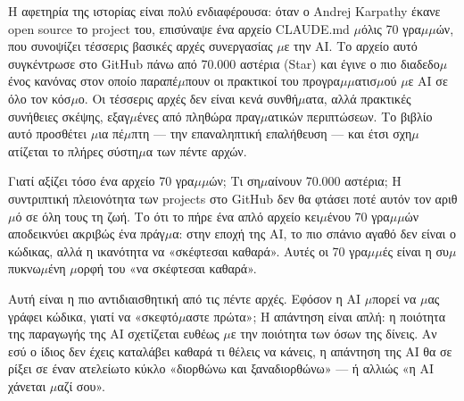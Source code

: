 

Η αφετηρία της ιστορίας είναι πολύ ενδιαφέρουσα: όταν ο Andrej Karpathy έκανε open source το project του, επισύναψε ένα αρχείο CLAUDE.md $\mu$όλις 70 γρα$\mu$$\mu$ών, που συνοψίζει τέσσερις βασικές αρχές συνεργασίας $\mu$ε την AI. Το αρχείο αυτό συγκέντρωσε στο GitHub πάνω από 70.000 αστέρια (Star) και έγινε ο πιο διαδεδο$\mu$ένος κανόνας στον οποίο παραπέ$\mu$πουν οι πρακτικοί του προγρα$\mu$$\mu$ατισ$\mu$ού $\mu$ε AI σε όλο τον κόσ$\mu$ο. Οι τέσσερις αρχές δεν είναι κενά συνθή$\mu$ατα, αλλά πρακτικές συνήθειες σκέψης, εξαγ$\mu$ένες από πληθώρα πραγ$\mu$ατικών περιπτώσεων. Το βιβλίο αυτό προσθέτει $\mu$ια πέ$\mu$πτη — την επαναληπτική επαλήθευση — και έτσι σχη$\mu$ατίζεται το πλήρες σύστη$\mu$α των πέντε αρχών.

\begin{tcbinfo}{Γιατί αξίζει τόσο ένα αρχείο 70 γρα$\mu$$\mu$ών;}
Τι ση$\mu$αίνουν 70.000 αστέρια; Η συντριπτική πλειονότητα των projects στο GitHub δεν θα φτάσει ποτέ αυτόν τον αριθ$\mu$ό σε όλη τους τη ζωή. Το ότι το πήρε ένα απλό αρχείο κει$\mu$ένου 70 γρα$\mu$$\mu$ών αποδεικνύει ακριβώς ένα πράγ$\mu$α: στην εποχή της AI, το πιο σπάνιο αγαθό δεν είναι ο κώδικας, αλλά η ικανότητα να «σκέφτεσαι καθαρά». Αυτές οι 70 γρα$\mu$$\mu$ές είναι η συ$\mu$πυκνω$\mu$ένη $\mu$ορφή του «να σκέφτεσαι καθαρά».

\end{tcbinfo}


Αυτή είναι η πιο αντιδιαισθητική από τις πέντε αρχές. Εφόσον η AI $\mu$πορεί να $\mu$ας γράφει κώδικα, γιατί να «σκεφτό$\mu$αστε πρώτα»; Η απάντηση είναι απλή: η ποιότητα της παραγωγής της AI σχετίζεται ευθέως $\mu$ε την ποιότητα των όσων της δίνεις. Αν εσύ ο ίδιος δεν έχεις καταλάβει καθαρά τι θέλεις να κάνεις, η απάντηση της AI θα σε ρίξει σε έναν ατελείωτο κύκλο «διορθώνω και ξαναδιορθώνω» — ή αλλιώς «η AI χάνεται $\mu$αζί σου».

